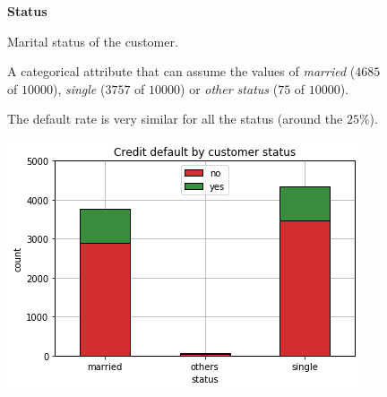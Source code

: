 \smallskip
\begin{figure}[h]
  \begin{minipage}[h]{.50\textwidth}
        {\Large \textbf{Status}}
        
        Marital status of the customer.
        
        A categorical attribute that can assume the values of 
        \textit{married} ($4685$ of $10000$),
        \textit{single} ($3757$ of $10000$) or
        \textit{other status} ($75$ of $10000$).
        
        The default rate is very similar for all the status (around the $25\%$).
  \end{minipage}
  \begin{minipage}[h]{.45\textwidth}
    \includegraphics[width=.95\textwidth]{img/ch2/status}
  \end{minipage}
\end{figure}

